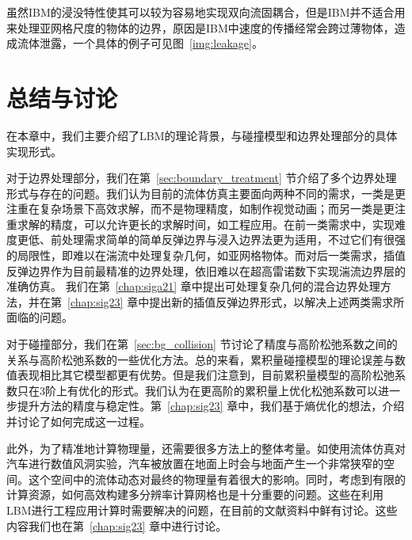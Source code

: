 虽然IBM的浸没特性使其可以较为容易地实现双向流固耦合，但是IBM并不适合用来处理亚网格尺度的物体的边界，原因是IBM中速度的传播经常会跨过薄物体，造成流体泄露，一个具体的例子可见图~\ref{img:leakage}。

\section{总结与讨论}
在本章中，我们主要介绍了LBM的理论背景，与碰撞模型和边界处理部分的具体实现形式。

对于边界处理部分，我们在第~\ref{sec:boundary_treatment} 节介绍了多个边界处理形式与存在的问题。我们认为目前的流体仿真主要面向两种不同的需求，一类是更注重在复杂场景下高效求解，而不是物理精度，如制作视觉动画；而另一类是更注重求解的精度，可以允许更长的求解时间，如工程应用。在前一类需求中，实现难度更低、前处理需求简单的简单反弹边界与浸入边界法更为适用，不过它们有很强的局限性，即难以在湍流中处理复杂几何，如亚网格物体。而对后一类需求，插值反弹边界作为目前最精准的边界处理，依旧难以在超高雷诺数下实现湍流边界层的准确仿真。
我们在第~\ref{chap:siga21} 章中提出可处理复杂几何的混合边界处理方法，并在第~\ref{chap:sig23} 章中提出新的插值反弹边界形式，以解决上述两类需求所面临的问题。

对于碰撞部分，我们在第~\ref{sec:bg_collision} 节讨论了精度与高阶松弛系数之间的关系与高阶松弛系数的一些优化方法。总的来看，累积量碰撞模型的理论误差与数值表现相比其它模型都更有优势。但是我们注意到，目前累积量模型的高阶松弛系数只在3阶上有优化的形式。我们认为在更高阶的累积量上优化松弛系数可以进一步提升方法的精度与稳定性。第~\ref{chap:sig23} 章中，我们基于熵优化的想法，介绍并讨论了如何完成这一过程。

此外，为了精准地计算物理量，还需要很多方法上的整体考量。如使用流体仿真对汽车进行数值风洞实验，汽车被放置在地面上时会与地面产生一个非常狭窄的空间。这个空间中的流体动态对最终的物理量有着很大的影响。同时，考虑到有限的计算资源，如何高效构建多分辨率计算网格也是十分重要的问题。这些在利用LBM进行工程应用计算时需要解决的问题，在目前的文献资料中鲜有讨论。这些内容我们也在第~\ref{chap:sig23} 章中进行讨论。